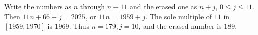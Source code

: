 Write the numbers as $n$ through $n+11$ and the erased one as $n+j$, $0\le j\le11$. Then $11n+66-j=2025$, or $11n=1959+j$. The sole multiple of $11$ in $[1959,1970]$ is $1969$. Thus $n=179,j=10$, and the erased number is $\boxed{189}$.
